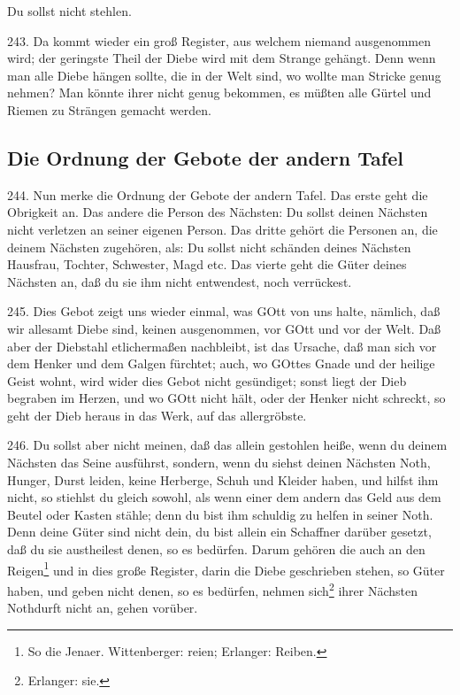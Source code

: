 \begin{schriftzitat}
Du sollst nicht stehlen.
\end{schriftzitat}

243. Da kommt wieder ein groß Register, aus welchem niemand ausgenommen wird; der geringste Theil der Diebe wird mit dem Strange gehängt. Denn wenn man alle Diebe hängen sollte, die in der Welt sind, wo wollte man Stricke genug nehmen? Man könnte ihrer nicht genug bekommen, es müßten alle Gürtel und Riemen zu Strängen gemacht werden.

\subsection{Die Ordnung der Gebote der andern Tafel}

244. Nun merke die Ordnung der Gebote der andern Tafel. Das erste geht die Obrigkeit an. Das andere die Person des Nächsten: Du sollst deinen Nächsten nicht verletzen an seiner eigenen Person. Das dritte gehört die Personen an, die deinem Nächsten zugehören, als: Du sollst nicht schänden deines Nächsten Hausfrau, Tochter, Schwester, Magd etc. Das vierte geht die Güter deines Nächsten an, daß du sie ihm nicht entwendest, noch verrückest.

245. Dies Gebot zeigt uns wieder einmal, was GOtt von uns halte, nämlich, daß wir allesamt Diebe sind, keinen ausgenommen, vor GOtt und vor der Welt. Daß aber der Diebstahl etlichermaßen nachbleibt, ist das Ursache, daß man sich vor dem Henker und dem
Galgen fürchtet; auch, wo GOttes Gnade und der heilige Geist wohnt, wird wider dies Gebot nicht gesündiget; sonst liegt der Dieb begraben im Herzen, und wo GOtt nicht hält, oder der Henker nicht schreckt, so geht der Dieb heraus in das Werk, auf das allergröbste.

246. Du sollst aber nicht meinen, daß das allein gestohlen heiße, wenn du deinem Nächsten das Seine ausführst, sondern, wenn du siehst deinen Nächsten Noth, Hunger, Durst leiden, keine Herberge, Schuh und Kleider haben, und hilfst ihm nicht, so stiehlst du gleich sowohl, als wenn einer dem andern das Geld aus dem Beutel oder Kasten stähle; denn du bist ihm schuldig zu helfen in seiner Noth. Denn deine Güter sind nicht dein, du bist allein ein Schaffner darüber gesetzt, daß du sie austheilest denen, so es bedürfen. Darum gehören die auch an den Reigen\footnote{So die Jenaer. Wittenberger: reien; Erlanger: Reiben.} und in dies große Register, darin die Diebe geschrieben stehen, so Güter haben, und geben nicht denen, so es bedürfen, nehmen sich\footnote{Erlanger: sie.} ihrer Nächsten Nothdurft nicht an, gehen vorüber.

